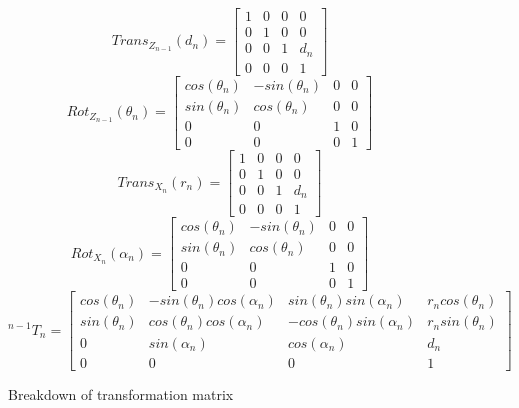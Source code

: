             \begin{figure}[H]
                \centering
                $$ Trans_{Z_{n-1}}(d_n) = \begin{bmatrix}
                    1 & 0 & 0 & 0 \\
                    0 & 1 & 0 & 0 \\
                    0 & 0 & 1 & d_n \\
                    0 & 0 & 0 & 1
                \end{bmatrix} $$
                $$ Rot_{Z_{n-1}}(\theta_n) = \begin{bmatrix}
                    cos(\theta_n) & -sin(\theta_n) & 0 & 0 \\
                    sin(\theta_n) & cos(\theta_n) & 0 & 0 \\
                    0 & 0 & 1 & 0 \\
                    0 & 0 & 0 & 1
                \end{bmatrix}$$
                $$ Trans_{X_n}(r_n) = \begin{bmatrix}
                    1 & 0 & 0 & 0 \\
                    0 & 1 & 0 & 0 \\
                    0 & 0 & 1 & d_n \\
                    0 & 0 & 0 & 1
                \end{bmatrix} $$
                $$ Rot_{X_{n}}(\alpha_n) = \begin{bmatrix}
                    cos(\theta_n) & -sin(\theta_n) & 0 & 0 \\
                    sin(\theta_n) & cos(\theta_n) & 0 & 0 \\
                    0 & 0 & 1 & 0 \\
                    0 & 0 & 0 & 1
                \end{bmatrix}$$
                $$ ^{n-1}T_n = \begin{bmatrix}
                    cos(\theta_n) & -sin(\theta_n) cos(\alpha_n) & sin(\theta_n) sin(\alpha_n) & r_n cos(\theta_n) \\
                    sin(\theta_n) & cos(\theta_n) cos(\alpha_n) & -cos(\theta_n) sin(\alpha_n) & r_n sin(\theta_n) \\
                    0 & sin(\alpha_n) & cos(\alpha_n) & d_n  \\
                    0 & 0 & 0 & 1
                \end{bmatrix}
                $$
                \caption{Breakdown of transformation matrix}
                \label{fig:TransformationMatrixBreakdown}
            \end{figure}

